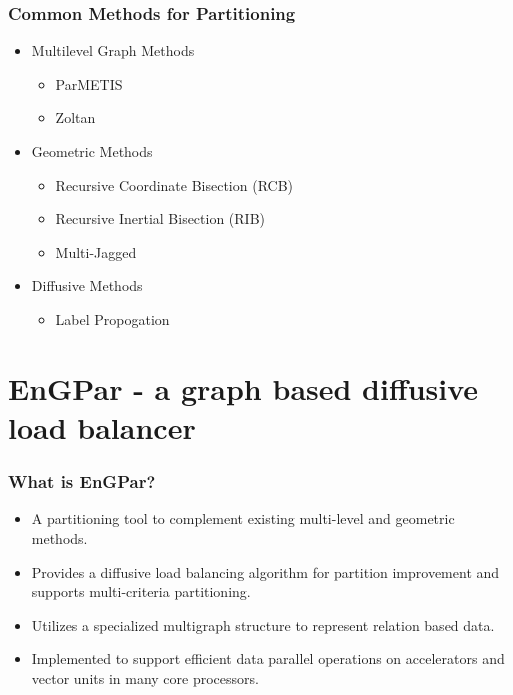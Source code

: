 \documentclass{beamer}
\begin{document}
\begin{frame}
  \frametitle{Common Methods for Partitioning}
  \begin{itemize}
  \item Multilevel Graph Methods %
    \begin{itemize}
    \item ParMETIS
    \item Zoltan
    \end{itemize}
  \item Geometric Methods %
    \begin{itemize}
    \item Recursive Coordinate Bisection (RCB)
    \item Recursive Inertial Bisection (RIB)
    \item Multi-Jagged
    \end{itemize}
  \item Diffusive Methods %
    \begin{itemize}
    \item Label Propogation
    \end{itemize}
  \end{itemize}
\end{frame}


\section{EnGPar - a graph based diffusive load balancer}

\begin{frame}
  \frametitle{What is EnGPar?}
  \begin{itemize}
  \item A partitioning tool to complement existing multi-level and geometric methods.
  \item Provides a diffusive load balancing algorithm for partition improvement and supports multi-criteria partitioning.
  \item Utilizes a specialized multigraph structure to represent relation based data.
  \item Implemented to support efficient data parallel operations on accelerators and vector units in many core processors.
  \end{itemize}
\end{frame}
\end{document}
